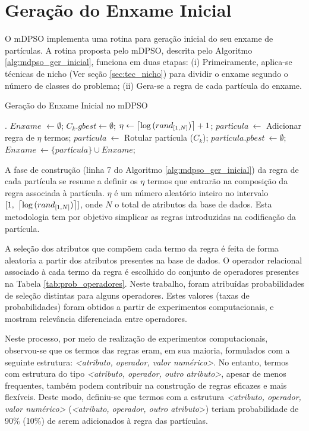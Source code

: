 \documentclass[
	12pt,				%
	openany,			%
	oneside,	
	a4paper,			%
	brazil,				%
	]{unimontes-ppgmsc-abntex2}
\DeclarePairedDelimiter{\ceil}{\lceil}{\rceil}
\begin{document}
\section{Geração do Enxame Inicial}
\label{sec:mdpso_ger_inicial}

O mDPSO implementa uma rotina para geração inicial do seu enxame de partículas. A rotina proposta pelo mDPSO, descrita pelo Algoritmo \ref{alg:mdpso_ger_inicial}, funciona em duas etapas: (i) Primeiramente, aplica-se técnicas de nicho (Ver seção \ref{sec:tec_nicho}) para dividir o enxame segundo o número de classes do problema; (ii) Gera-se a regra de cada partícula do enxame. 

\begin{algorithm}[ht]
\caption{Geração do Enxame Inicial no mDPSO}
\label{alg:mdpso_ger_inicial}
\begin{algorithmic}[1]
.
\State $Enxame$ $\leftarrow \emptyset$;
 \State $C_k.gbest \leftarrow \emptyset$;
\EndFor
{}
 \State $\eta \leftarrow \ceil[\big]{\log{(rand_{[1, N]})}} + 1$;
 \State $partícula\ \leftarrow$ Adicionar regra de $\eta$ termos;
 \State $partícula\ \leftarrow$ Rotular partícula ($C_k$);
 \State $partícula.pbest\ \leftarrow  \emptyset$;
 \State $Enxame\ \leftarrow  \{partícula\} \cup Enxame$;
\EndFor
\end{algorithmic}
\end{algorithm}

A fase de construção (linha 7 do Algoritmo \ref{alg:mdpso_ger_inicial}) da regra de cada partícula se resume a definir os $\eta$ termos que entrarão na composição da regra associada à partícula. $\eta$ é um número aleatório inteiro no intervalo $[1, \  \ceil[\big]{\log{(rand_{[1, N]})}}]$, onde $N$ o total de atributos da base de dados. Esta metodologia tem por objetivo simplicar as regras introduzidas na codificação da partícula.
 
A seleção dos atributos que compõem cada termo da regra é feita de forma aleatoria a partir dos atributos presentes na base de dados. O operador relacional associado à cada termo da regra é escolhido do conjunto de operadores presentes na Tabela \ref{tab:prob_operadores}. Neste trabalho, foram atribuídas probabilidades de seleção distintas para alguns operadores. Estes valores (taxas de probabilidades) foram obtidos a partir de experimentos computacionais, e mostram relevância diferenciada entre operadores.

Neste processo, por meio de realização de experimentos computacionais, observou-se que os termos das regras eram, em sua maioria, formulados com a seguinte estrutura: \textit{<atributo, operador, valor numérico>}. No entanto, termos com estrutura do tipo \textit{<atributo, operador, outro atributo>}, apesar de menos frequentes, também podem contribuir na construção de regras eficazes e mais flexíveis. Deste modo, definiu-se que termos com a estrutura \textit{<atributo, operador, valor numérico>} (\textit{<atributo, operador, outro atributo}>) teriam probabilidade de 90\% (10\%) de serem adicionados à regra das partículas.
\end{document}
